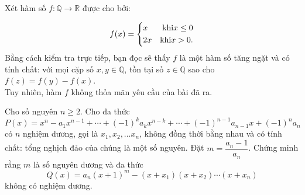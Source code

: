 \begin{bt}
{		\begin{nx}
			Xét hàm số $ f\colon \mathbb{Q}\rightarrow \mathbb{R} $ được cho bởi:
			
			$$f(x)=\left\{\begin{aligned}&x &\text{khi}  x\le 0\\&2x &\text{khi} x>0. \end{aligned}\right. $$
			Bằng cách kiểm tra trực tiếp, bạn đọc sẽ thấy $ f $ là một hàm số tăng ngặt và có tính chất: với mọi cặp số $ x,y\in \mathbb{Q} $, tồn tại số $ z\in \mathbb{Q} $ sao cho $ f(z) =f(y) -f(x) $.\\
			Tuy nhiên, hàm $ f $ không thỏa mãn yêu cầu của bài đã ra.
		\end{nx}
	}
\end{bt}

\begin{bt}%
	Cho số nguyên $ n\ge 2 $. Cho đa thức $$ P(x)=x^n-a_1x^{n-1}+\cdots +(-1)^ka_kx^{n-k} +\cdots +(-1)^{n-1}a_{n-1}x+(-1)^na_n $$
	có $ n $ nghiệm dương, gọi là $ x_1,x_2,\ldots x_n $, không đồng thời bằng nhau và có tính chất: tổng nghịch đảo của chúng là một số nguyên.	Đặt $ m=\dfrac{a_n-1}{a_n} $. Chứng minh rằng $ m $ là số nguyên dương và đa thức
	$$ Q(x) =a_n(x+1)^m-(x+x_1)(x+x_2)\cdots (x+x_n) $$
	không có nghiệm dương.
\end{bt}
